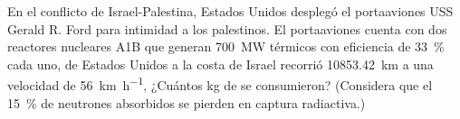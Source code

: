 \documentclass[./../main.tex]{subfiles}
\begin{document}
    \begin{exercise}
        En el conflicto de Israel-Palestina, Estados Unidos desplegó el portaaviones USS Gerald R. Ford para intimidad a los palestinos. El portaaviones cuenta con dos reactores nucleares A1B que generan \qty{700}{\MW} térmicos con eficiencia de \qty{33}{\percent} cada uno, de Estados Unidos a la costa de Israel recorrió \qty{10853.42}{\km} a una velocidad de \qty{56}{\km\per\hour}, ¿Cuántos \unit{\kg} de  se consumieron? (Considera que el \qty{15}{\percent} de neutrones absorbidos se pierden en captura radiactiva.)
    \end{exercise}
\end{document}
